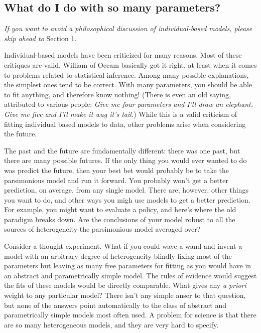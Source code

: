 \documentclass{article}
\begin{document}
\clearpage 

\subsection{What do I do with so many parameters?} 

\begin{displayquote}
{\em If you want to avoid a philosophical discussion of individual-based models, please skip ahead to} Section 1.
\end{displayquote}

Individual-based models have been criticized for many reasons. Most of these critiques are valid. William of Occam basically got it right, at least when it comes to problems related to statistical inference. Among many possible explanations, the simplest ones tend to be correct. With many parameters, you should be able to fit anything, and therefore know nothing! (There is even an old saying, attributed to various people: {\em Give me four parameters and I'll draw an elephant. Give me five and I'll make it wag it's tail.})  While this is a valid criticism of fitting individual based models to data, other problems arise when considering the future.

The past and the future are fundamentally different: there was one past, but there are many possible futures.  If the only thing you would ever wanted to do was predict the future, then your best bet would probably be to take the parsimonious model and run it forward. You probably won't get a better prediction, on average, from any single model. There are, however, other things you want to do, and other ways you migh use models to get a better prediction. For example, you might want to evaluate a policy, and here's where the old paradigm breaks down. Are the conclusions of your model robust to all the sources of heterogeneity the parsimonious model averaged over?

Consider a thought experiment. What if you could wave a wand and invent a model with an arbitrary degree of heterogeneity blindly fixing most of the parameters but leaving as many free parameters for fitting as you would have in an abstract and parametrically simple model. The rules of evidence would suggest the fits of these  models would be directly comparable. What gives any {\em a priori} weight to any particular model? There isn't any simple anser to that question, but none of the answers point automatically to the class of abstract and parametrically simple models most often used. A problem for science is that there are so many heterogeneous models, and they are very hard to specify. 
\end{document}
